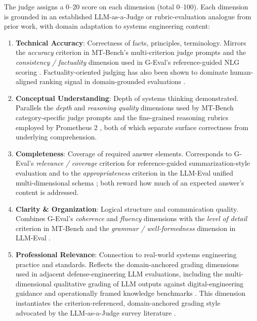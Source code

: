 The judge assigns a 0--20 score on each dimension (total 0--100). Each dimension is grounded in an established LLM-as-a-Judge or rubric-evaluation analogue from prior work, with domain adaptation to systems engineering content:
\begin{enumerate}
    \item \textbf{Technical Accuracy}: Correctness of facts, principles, terminology. Mirrors the \emph{accuracy} criterion in MT-Bench's multi-criterion judge prompts \cite{zheng_JudgingLLMasaJudgeMTBench_2023} and the \emph{consistency / factuality} dimension used in G-Eval's reference-guided NLG scoring \cite{liu_GEvalNLGEvaluationUsing_2023}. Factuality-oriented judging has also been shown to dominate human-aligned ranking signal in domain-grounded evaluations \cite{fuQGEvalBenchmarkingMultidimensional2024}.
    \item \textbf{Conceptual Understanding}: Depth of systems thinking demonstrated. Parallels the \emph{depth} and \emph{reasoning quality} dimensions used by MT-Bench category-specific judge prompts \cite{zheng_JudgingLLMasaJudgeMTBench_2023} and the fine-grained reasoning rubrics employed by Prometheus 2 \cite{kim2024prometheus}, both of which separate surface correctness from underlying comprehension.
    \item \textbf{Completeness}: Coverage of required answer elements. Corresponds to G-Eval's \emph{relevance / coverage} criterion for reference-guided summarization-style evaluation \cite{liu_GEvalNLGEvaluationUsing_2023} and to the \emph{appropriateness} criterion in the LLM-Eval unified multi-dimensional schema \cite{lin_LLMEvalUnifiedMultiDimensionalAutomatic_2023}; both reward how much of an expected answer's content is addressed.
    \item \textbf{Clarity \& Organization}: Logical structure and communication quality. Combines G-Eval's \emph{coherence} and \emph{fluency} dimensions \cite{liu_GEvalNLGEvaluationUsing_2023} with the \emph{level of detail} criterion in MT-Bench \cite{zheng_JudgingLLMasaJudgeMTBench_2023} and the \emph{grammar / well-formedness} dimension in LLM-Eval \cite{lin_LLMEvalUnifiedMultiDimensionalAutomatic_2023}.
    \item \textbf{Professional Relevance}: Connection to real-world systems engineering practice and standards. Reflects the domain-anchored grading dimensions used in adjacent defense-engineering LLM evaluations, including the multi-dimensional qualitative grading of LLM outputs against digital-engineering guidance \cite{Collard_Automated_Knowledge_Base_Generation_Open_Source_LLMs_RAG_2025} and operationally framed knowledge benchmarks \cite{parham_JointStaffBench_2025}. This dimension instantiates the criterion-referenced, domain-anchored grading style advocated by the LLM-as-a-Judge survey literature \cite{gu_survey_on_llm_as_a_judge_2025}.
\end{enumerate}

